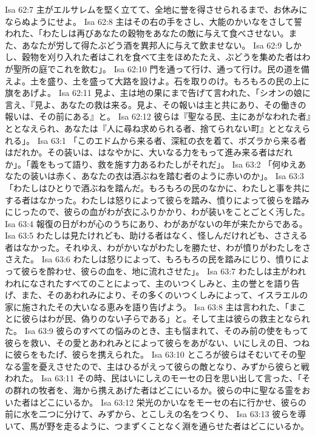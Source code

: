 Isa 62:7  主がエルサレムを堅く立てて、全地に誉を得させられるまで、お休みにならぬようにせよ。
Isa 62:8  主はその右の手をさし、大能のかいなをさして誓われた、「わたしは再びあなたの穀物をあなたの敵に与えて食べさせない。また、あなたが労して得たぶどう酒を異邦人に与えて飲ませない。
Isa 62:9  しかし、穀物を刈り入れた者はこれを食べて主をほめたたえ、ぶどうを集めた者はわが聖所の庭でこれを飲む」。
Isa 62:10  門を通って行け、通って行け。民の道を備えよ。土を盛り、土を盛って大路を設けよ。石を取りのけ。もろもろの民の上に旗をあげよ。
Isa 62:11  見よ、主は地の果にまで告げて言われた、「シオンの娘に言え、『見よ、あなたの救は来る。見よ、その報いは主と共にあり、その働きの報いは、その前にある』と。
Isa 62:12  彼らは『聖なる民、主にあがなわれた者』ととなえられ、あなたは『人に尋ね求められる者、捨てられない町』ととなえられる」。
Isa 63:1  「このエドムから来る者、深紅の衣を着て、ボズラから来る者はだれか。その装いは、はなやかに、大いなる力をもって進み来る者はだれか」。「義をもって語り、救を施す力あるわたしがそれだ」。
Isa 63:2  「何ゆえあなたの装いは赤く、あなたの衣は酒ぶねを踏む者のように赤いのか」。
Isa 63:3  「わたしはひとりで酒ぶねを踏んだ。もろもろの民のなかに、わたしと事を共にする者はなかった。わたしは怒りによって彼らを踏み、憤りによって彼らを踏みにじったので、彼らの血がわが衣にふりかかり、わが装いをことごとく汚した。
Isa 63:4  報復の日がわが心のうちにあり、わがあがないの年が来たからである。
Isa 63:5  わたしは見たけれども、助ける者はなく、怪しんだけれども、ささえる者はなかった。それゆえ、わがかいながわたしを勝たせ、わが憤りがわたしをささえた。
Isa 63:6  わたしは怒りによって、もろもろの民を踏みにじり、憤りによって彼らを酔わせ、彼らの血を、地に流れさせた」。
Isa 63:7  わたしは主がわれわれになされたすべてのことによって、主のいつくしみと、主の誉とを語り告げ、また、そのあわれみにより、その多くのいつくしみによって、イスラエルの家に施されたその大いなる恵みを語り告げよう。
Isa 63:8  主は言われた、「まことに彼らはわが民、偽りのない子らである」と。そして主は彼らの救主となられた。
Isa 63:9  彼らのすべての悩みのとき、主も悩まれて、そのみ前の使をもって彼らを救い、その愛とあわれみとによって彼らをあがない、いにしえの日、つねに彼らをもたげ、彼らを携えられた。
Isa 63:10  ところが彼らはそむいてその聖なる霊を憂えさせたので、主はひるがえって彼らの敵となり、みずから彼らと戦われた。
Isa 63:11  その時、民はいにしえのモーセの日を思い出して言った、「その群れの牧者を、海から携えあげた者はどこにいるか。彼らの中に聖なる霊をおいた者はどこにいるか。
Isa 63:12  栄光のかいなをモーセの右に行かせ、彼らの前に水を二つに分けて、みずから、とこしえの名をつくり、
Isa 63:13  彼らを導いて、馬が野を走るように、つまずくことなく淵を通らせた者はどこにいるか。
